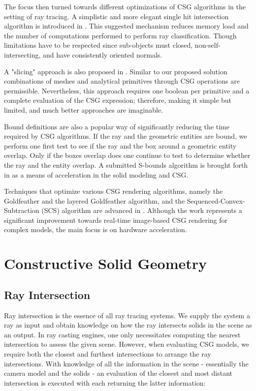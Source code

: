 \documentclass[a4paper,11pt,oneside]{article}
\begin{document}
The focus then turned towards different optimizations of CSG algorithms in the setting of ray tracing. A simplistic and more elegant single hit intersection algorithm is introduced in \cite{kensler_ray_2006}. This suggested mechanism reduces memory load and the number of computations performed to perform ray classification. Though limitations have to be respected since sub-objects must closed, non-self-intersecting, and have consistently oriented normals.
  
A "slicing" approach is also proposed in \cite{lefebvre:hal-00926861}. Similar to our proposed solution combinations of meshes and analytical primitives through CSG operations are permissible. Nevertheless, this approach requires one boolean per primitive and a complete evaluation of the CSG expression; therefore, making it simple but limited, and much better approaches are imaginable.

Bound definitions are also a popular way of significantly reducing the time required by CSG algorithms. If the ray and the geometric entities are bound, we perform one first test to see if the ray and the box around a geometric entity overlap. Only if the boxes overlap does one continue to test to determine whether the ray and the entity overlap. A submitted S-bounds algorithm is brought forth in \cite{bounding_algorithms} as a means of acceleration in the solid modeling and CSG.
  
Techniques that optimize various CSG rendering algorithms, namely the Goldfeather and the layered Goldfeather algorithm, and the Sequenced-Convex- Subtraction (SCS) algorithm are advanced in \cite{hardware_accelerated_image_based_csg.}. Although the work represents a significant improvement towards real-time image-based CSG rendering for complex models,  the main focus is on hardware acceleration.
  

\section{Constructive Solid Geometry}
    
\subsection{Ray Intersection}
\label{section:ray-intersection}

Ray intersection is the essence of all ray tracing systems. We supply the system a ray as input and obtain knowledge on how the ray intersects solids in the scene as an output. In ray casting engines, one only necessitates computing the nearest intersection to assess the given scene. However, when evaluating CSG models, we require both the closest and furthest intersections to arrange the ray intersections. With knowledge of all the information in the scene - essentially the camera model and the solids - an evaluation of the closest and most distant intersection is executed with each returning the latter information:
\end{document}
